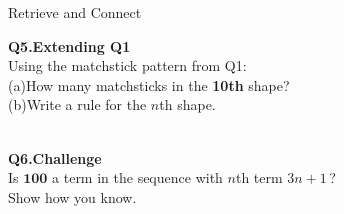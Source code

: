 \documentclass{beamer}
\newcommand{\ashow}[1]{\uncover<2->{\textcolor{red}{\small #1}}}
\begin{document}
\begin{frame}[shrink=5]{Retrieve and Connect}
  \vspace{0.4cm}

  \begin{minipage}[t]{0.48\textwidth}
    \small\textbf{Q5.\enspace Extending Q1}\\
    \footnotesize
    Using the matchstick pattern from Q1:\\
    (a)\;How many matchsticks in the \textbf{10th} shape?\\
    (b)\;Write a rule for the $n$th shape.\\[0.2em]
    \ashow{(a)\;31 matchsticks.}\\
    \ashow{(b)\;position-to-term rule:\;$3n+1$}
  \end{minipage}\hfill
  \begin{minipage}[t]{0.48\textwidth}
    \small\textbf{Q6.\;Challenge}\\
    \footnotesize
    Is $\boldsymbol{100}$ a term in the sequence
    with $n$th term $3n+1$\,?\\
    Show how you know.\\[0.2em]
    \ashow{Yes, when $n=33$,}\\
    \ashow{$3n+1=3\times33+1=99+1=100$}
  \end{minipage}

\end{frame}
\end{document}
